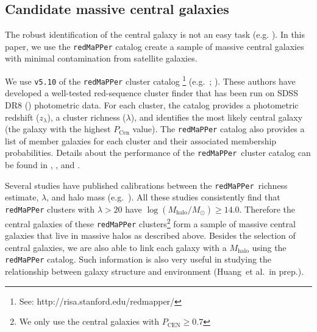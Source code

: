 \documentclass[a4paper,fleqn,usenatbib]{mnras}
\def\etal{{\ et al.~}}
\def\redm{\texttt{redMaPPer}}
\def\mstar{{$M_{\star}$}}
\def\mhalo{{$M_{\mathrm{halo}}$}}
\def\logmtot{{$\log (M_{\star,100\mathrm{kpc}}/M_{\odot})$}}
\begin{document}
\subsection{Candidate massive central galaxies}
    \label{ssec:redmapper}
    
    The robust identification of the central galaxy is not an easy task (e.g. \citealt{Yang2007}). In this paper, we use the \redm{} catalog create a sample of massive central galaxies with minimal contamination from satellite galaxies.
    
    
    We use \texttt{v5.10} of the \redm{} cluster  catalog
    \footnote{See: http://risa.stanford.edu/redmapper/} 
    (e.g.\ \citealt{Rykoff2014}; \citealt{Rozo2015b}). 
    These authors have developed a well-tested red-sequence cluster finder that has 
    been run on SDSS DR8 (\citealt{SDSSDR8}) photometric data. 
    For each cluster, the catalog provides a photometric redshift ($z_{\lambda}$), a 
    cluster richness ($\lambda$), and identifies the most likely central galaxy (the 
    galaxy with the highest $P_{\mathrm{Cen}}$ value). 
    The \redm{}{} catalog also provides a list of member galaxies for each cluster and 
    their associated membership probabilities. 
    Details about the performance of the \redm{}~cluster catalog can be found in 
    \citet{Rozo2014}, \citet{Rozo2015a}, and \citet{Rozo2015b}. 
    
    Several studies have published calibrations between the \redm{}~richness estimate, 
    $\lambda$, and halo mass (e.g.\ \citealt{Saro2015, Farahi2016, Simet2016, 
    Melchior2016}). 
    All these studies consistently find that \redm{} clusters with $\lambda > 20$ 
    have $\log (M_{\mathrm{halo}}/M_{\odot}) \geq 14.0$. 
    Therefore the central galaxies of these \redm{} clusters\footnote{We only use the 
    central galaxies with $P_{\mathrm{CEN}} \geq 0.7$} form a sample of massive central 
    galaxies that live in massive halos as described above.
    Besides the selection of central galaxies, we are also able to link each galaxy
    with a \mhalo{} using the \redm{} catalog. 
    Such information is also very useful in studying the relationship between galaxy
    structure and environment (Huang\etal in prep.).
\end{document}
